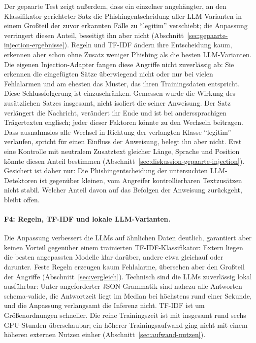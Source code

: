 \documentclass[12pt,twoside=false,a4paper,parskip]{scrbook}
\begin{document}
Der gepaarte Test zeigt außerdem, dass ein einzelner angehängter, an den Klassifikator gerichteter Satz die Phishingentscheidung aller LLM-Varianten in einem Großteil der zuvor erkannten Fälle zu \enquote{legitim} verschiebt; die Anpassung verringert diesen Anteil, beseitigt ihn aber nicht (Abschnitt~\ref{sec:gepaarte-injection-ergebnisse}). Regeln und TF-IDF ändern ihre Entscheidung kaum, erkennen aber schon ohne Zusatz weniger Phishing als die besten LLM-Varianten. Die eigenen Injection-Adapter fangen diese Angriffe nicht zuverlässig ab: Sie erkennen die eingefügten Sätze überwiegend nicht oder nur bei vielen Fehlalarmen und am ehesten das Muster, das ihren Trainingsdaten entspricht.
Diese Schlussfolgerung ist einzuschränken. Gemessen wurde die Wirkung des zusätzlichen Satzes insgesamt, nicht isoliert die seiner Anweisung. Der Satz verlängert die Nachricht, verändert ihr Ende und ist bei anderssprachigen Trägertexten englisch; jeder dieser Faktoren könnte zu den Wechseln beitragen. Dass ausnahmslos alle Wechsel in Richtung der verlangten Klasse \enquote{legitim} verlaufen, spricht für einen Einfluss der Anweisung, belegt ihn aber nicht. Erst eine Kontrolle mit neutralem Zusatztext gleicher Länge, Sprache und Position könnte diesen Anteil bestimmen (Abschnitt~\ref{sec:diskussion-gepaarte-injection}). Gesichert ist daher nur: Die Phishingentscheidung der untersuchten LLM-Detektoren ist gegenüber kleinen, vom Angreifer kontrollierbaren Textzusätzen nicht stabil. Welcher Anteil davon auf das Befolgen der Anweisung zurückgeht, bleibt offen.

\paragraph{F4: Regeln, TF-IDF und lokale LLM-Varianten.}
Die Anpassung verbessert die LLMs auf ähnlichen Daten deutlich, garantiert aber keinen Vorteil gegenüber einem trainierten TF-IDF-Klassifikator: Extern liegen die besten angepassten Modelle klar darüber, andere etwa gleichauf oder darunter. Feste Regeln erzeugen kaum Fehlalarme, übersehen aber den Großteil der Angriffe (Abschnitt~\ref{sec:vergleich}). Technisch sind die LLMs zuverlässig lokal ausführbar: Unter angeforderter JSON-Grammatik sind nahezu alle Antworten schema-valide, die Antwortzeit liegt im Median bei höchstens rund einer Sekunde, und die Anpassung verlangsamt die Inferenz nicht. TF-IDF ist um Größenordnungen schneller. Die reine Trainingszeit ist mit insgesamt rund sechs GPU-Stunden überschaubar; ein höherer Trainingsaufwand ging nicht mit einem höheren externen Nutzen einher (Abschnitt~\ref{sec:aufwand-nutzen}).
\end{document}
